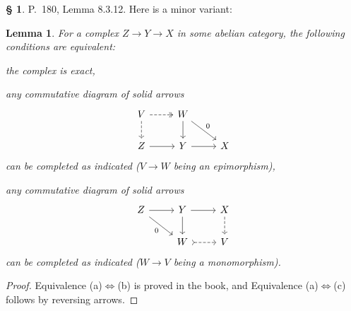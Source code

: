 \documentclass[12pt]{article}
\newtheorem{lem}[thm]{Lemma}
\theoremstyle{remark}
\theoremstyle{definition}
\newtheorem{s}[thm]{\S}
\newcommand{\nn}{\noindent}
\newcommand{\ssi}{\Leftrightarrow}
\begin{document}
%

\begin{s}
P.~180, Lemma 8.3.12. Here is a minor variant:

\begin{lem}\label{8312}
For a complex $Z\to Y\to X$ in some abelian category, the following conditions are equivalent:

\nn{\em(a)} the complex is exact,

\nn{\em(b)} any commutative diagram of solid arrows
$$
\begin{tikzcd}
V\ar[dashed]{d}\ar[dashed, two heads]{r}&W\ar{dr}{0}\ar{d}\\ 
Z\ar{r}&Y\ar{r}&X
\end{tikzcd}
$$ 
can be completed as indicated ($V\to W$ being an epimorphism),

\nn{\em(c)} any commutative diagram of solid arrows
$$
\begin{tikzcd}
Z\ar{dr}[swap]{0}\ar{r}&Y\ar{d}\ar{r}&X\ar[dashed]{d}\\ 
{}&W\ar[tail,dashed]{r}&V
\end{tikzcd}
$$ 
can be completed as indicated ($W\to V$ being a monomorphism).
\end{lem}

\begin{proof}
Equivalence (a)$\ssi$(b) is proved in the book, and Equivalence (a)$\ssi$(c) follows by reversing arrows.
\end{proof}
\end{s}

%
\end{document}
